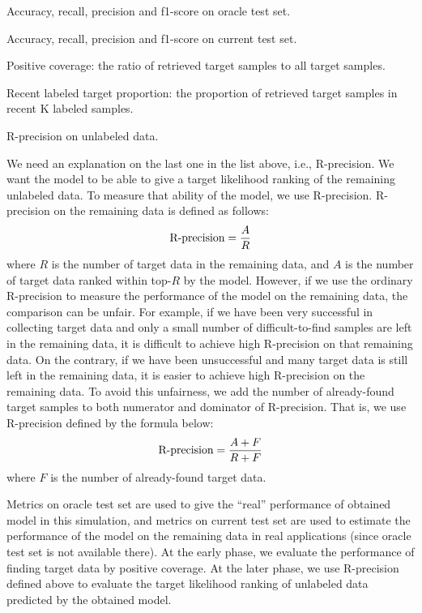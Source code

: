 \documentclass{deime}
\newcommand{\cmark}{\ding{51}}%
\newcommand{\done}{\rlap{$\square$}{\raisebox{2pt}{\large\hspace{1pt}\cmark}}%
\hspace{-2.5pt}}
\begin{document}
\begin{todolist}
  \item Accuracy, recall, precision and f1-score on oracle test set.
  \item[\done] Accuracy, recall, precision and f1-score on current test set.
  \item Positive coverage: the ratio of retrieved target samples to all target samples.
  \item[\done] Recent labeled target proportion: the proportion of
  retrieved target samples in recent K labeled samples.
  \item R-precision on unlabeled data.
\end{todolist}

We need an explanation on the last one in the list above, i.e.,
R-precision.  We want the model to be able to give a target likelihood
ranking of the remaining unlabeled data.  To measure that ability of
the model, we use R-precision.  R-precision on the remaining data is
defined as follows:
%
\[
\mbox{\rm R-precision} = \frac{A}{R}
\]
%
where $R$ is the number of target data in the remaining data, and $A$
is the number of target data ranked within top-$R$ by the model.
However, if we use the ordinary R-precision to measure the performance
of the model on the remaining data, the comparison can be unfair.  For
example, if we have been very successful in collecting target data and
only a small number of difficult-to-find samples are left in the
remaining data, it is difficult to achieve high R-precision on that
remaining data.  On the contrary, if we have been unsuccessful and
many target data is still left in the remaining data, it is easier to
achieve high R-precision on the remaining data.  To avoid this
unfairness, we add the number of already-found target samples to both
numerator and dominator of R-precision.  That is, we use R-precision
defined by the formula below:
\[
\mbox{\rm R-precision} = \frac{A+F}{R+F}
\]
where $F$ is the number of already-found target data.

Metrics on oracle test set are used to give the ``real'' performance
of obtained model in this simulation, and metrics on current test set
are used to estimate the performance of the model on the remaining
data in real applications (since oracle test set is not available
there). At the early phase, we evaluate the performance of finding
target data by positive coverage. At the later phase, we use
R-precision defined above to evaluate the target likelihood ranking of
unlabeled data predicted by the obtained model.
\end{document}
